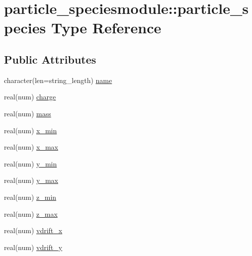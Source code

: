 \hypertarget{structparticle__speciesmodule_1_1particle__species}{}\section{particle\+\_\+speciesmodule\+:\+:particle\+\_\+species Type Reference}
\label{structparticle__speciesmodule_1_1particle__species}
\subsection*{Public Attributes}
\begin{DoxyCompactItemize}
\item 
character(len=string\+\_\+length) \hyperlink{structparticle__speciesmodule_1_1particle__species_aa1e042e7e07eb5fbf85a87e3fde7e325}{name}
\item 
real(num) \hyperlink{structparticle__speciesmodule_1_1particle__species_a05f3c94b07c83bf5dfa7db9f240866aa}{charge}
\item 
real(num) \hyperlink{structparticle__speciesmodule_1_1particle__species_a06cae9ba8f87d3cfcfd1df4b7b2a31d6}{mass}
\item 
real(num) \hyperlink{structparticle__speciesmodule_1_1particle__species_a21d37650e80b2dba525e21c357f525c2}{x\+\_\+min}
\item 
real(num) \hyperlink{structparticle__speciesmodule_1_1particle__species_a957bf2cb43e37c39d47f5f3ade56df35}{x\+\_\+max}
\item 
real(num) \hyperlink{structparticle__speciesmodule_1_1particle__species_ae996ec1f900c2607ad220c0a1813487d}{y\+\_\+min}
\item 
real(num) \hyperlink{structparticle__speciesmodule_1_1particle__species_a341bde0930d6c60b000e1d0aa1d1c61e}{y\+\_\+max}
\item 
real(num) \hyperlink{structparticle__speciesmodule_1_1particle__species_ac0dc85e67cc9339413fd205f454ca487}{z\+\_\+min}
\item 
real(num) \hyperlink{structparticle__speciesmodule_1_1particle__species_a71d56c3b0cdb8b96056560d918181454}{z\+\_\+max}
\item 
real(num) \hyperlink{structparticle__speciesmodule_1_1particle__species_a85b74bc5600957f431334c9385b52658}{vdrift\+\_\+x}
\item 
real(num) \hyperlink{structparticle__speciesmodule_1_1particle__species_ad0b494647be9cce68aa240914b853e24}{vdrift\+\_\+y}
\item 

\end{DoxyCompactItemize}
